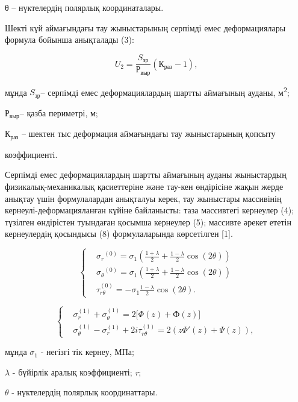 \begin{multicols}{2}
θ -- нүктелердің полярлық координаталары.

Шекті күй аймағындағы тау жыныстарының серпімді емес деформациялары
формула бойынша анықталады (3):

\begin{equation}
U_{2} = \frac{S_{зр}}{Р_{выр}}(К_{раз} - 1),
\end{equation}

мұнда \(S_{зр}\)-- серпімді емес деформациялардың шартты аймағының
ауданы, м\textsuperscript{2};

\(Р_{выр}\)-- қазба периметрі, м;

\(К_{раз}\) -- шектен тыс деформация аймағындағы тау жыныстарының
қопсыту

коэффициенті.

Серпімді емес деформациялардың шартты аймағының ауданы жыныстардың
физикалық-механикалық қасиеттеріне және тау-кен өндірісіне жақын жерде
анықтау үшін формулалардан анықталуы керек, тау жыныстары массивінің
кернеулі-деформацияланған күйіне байланысты: таза массивтегі кернеулер
(4); түзілген өндірістен туындаған қосымша кернеулер (5); массивте
әрекет ететін кернеулердің қосындысы (8) формулаларында көрсетілген
{[}1{]}.

\begin{equation}
\left\{\begin{aligned}
 & {\sigma_{r}}^{(0)} = \sigma_{1}(\frac{1 + \lambda}{2} + \frac{1 - \lambda}{2}\cos(2\theta)) \\
 & {\sigma_{\theta}}^{(0)} = \sigma_{1}(\frac{1 + \lambda}{2} + \frac{1 - \lambda}{2}\cos(2\theta)) \\
 & \tau_{r\theta}^{(0)} = - \sigma_{1}\frac{1 - \lambda}{2}\cos(2\theta).
\end{aligned} \right.
\end{equation}

\begin{equation}
\left\{ \begin{aligned}
 & \sigma_{r}^{(1)} + \sigma_{\theta}^{(1)} = 2\lbrack\Phi(z) + Ф(z)\rbrack \\
 & \sigma_{\theta}^{(1)} - \sigma_{r}^{(1)} + 2i\tau_{r\theta}^{(1)} = 2(z\Phi'(z) + \Psi(z)),
\end{aligned} \right.
\end{equation}

мұнда \(\sigma_{1}\) - негізгі тік кернеу, МПа;

\(\lambda\) - бүйірлік аралық коэффициенті; \emph{r};

\(\theta\) - нүктелердің полярлық координаттары.
\end{multicols}

